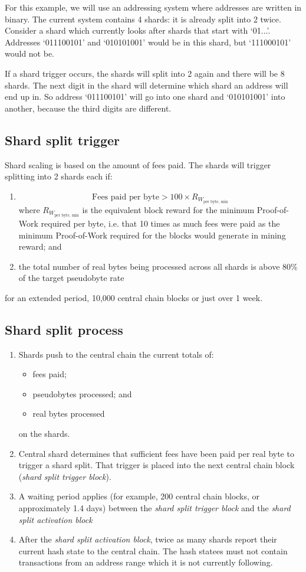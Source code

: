 \documentclass[a4paper,12pt]{article}
\begin{document}
For this example, we will use an addressing system where addresses are written in binary. The current system contains 4 shards: it is already split into 2 twice. Consider a shard which currently looks after shards that start with `01...'. Addresses `011100101' and `010101001' would be in this shard, but `111000101' would not be. 

If a shard trigger occurs, the shards will split into 2 again and there will be 8 shards. The next digit in the shard will determine which shard an address will end up in. So address `011100101' will go into one shard and `010101001' into another, because the third digits are different. 

\subsection{Shard split trigger}
Shard scaling is based on the amount of fees paid. The shards will trigger splitting into 2 shards each if:

\begin{enumerate}
  \item 
    \[\text{Fees paid per byte} > 100 \times R_{W_{\text{per byte, min}}} \]
    where $R_{W_{\text{per byte, min}}}$ is the equivalent block reward for the minimum Proof-of-Work required per byte, i.e. that 10 times as much fees were paid as the minimum Proof-of-Work required for the blocks would generate in mining reward; and 
  \item the total number of real bytes being processed across all shards is above 80\% of the target pseudobyte rate
\end{enumerate}
for an extended period, 10,000 central chain blocks or just over 1 week.

\subsection{Shard split process}

\begin{enumerate}
  \item Shards push to the central chain the current totals of:
  \begin{itemize}
    \item fees paid;
    \item pseudobytes processed; and
    \item real bytes processed 
  \end{itemize}
  on the shards.
  \item Central shard determines that sufficient fees have been paid per real byte to trigger a shard split. That trigger is placed into the next central chain block (\textit{shard split trigger block}).
  \item A waiting period applies (for example, 200 central chain blocks, or approximately 1.4 days) between the \textit{shard split trigger block} and the \textit{shard split activation block}
  \item After the \textit{shard split activation block}, twice as many shards report their current hash state to the central chain. The hash statees must not contain transactions from an address range which it is not currently following.
\end{enumerate}
\end{document}
